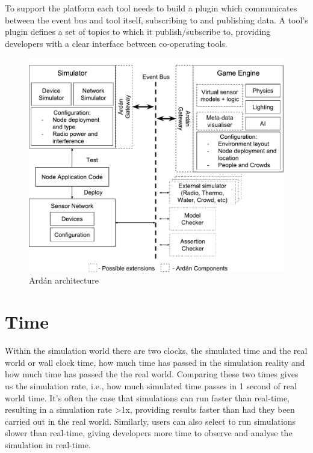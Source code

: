 To support the platform each tool needs to build a plugin which communicates between the event bus and tool itself, subscribing to and publishing data. A tool's plugin defines a set of topics to which it publish/subscribe to, providing developers with a clear interface between co-operating tools.
\begin{figure}[ht]
\centering
  \includegraphics[width=\textwidth]{./imgs/architecture}
  \caption{Ard\'{a}n architecture}
  \label{fig:architecture}
\end{figure}



\section{Time} %
\label{sub:time}
Within the simulation world there are two clocks, the simulated time and the real world or wall clock time, how much time has passed in the simulation reality and how much time has passed the the real world. Comparing these two times gives us the simulation rate, i.e., how much simulated time passes in 1 second of real world time. It's often the case that simulations can run faster than real-time, resulting in a simulation rate >1x, providing results faster than had they been carried out in the real world. Similarly, users can also select to run simulations slower than real-time, giving developers more time to observe and analyse the simulation in real-time.

